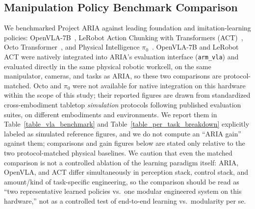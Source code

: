 \documentclass[journal]{IEEEtran}
\begin{document}
\subsection{Manipulation Policy Benchmark Comparison}
We benchmarked Project ARIA against leading foundation and imitation-learning policies: OpenVLA-7B~\cite{kim2024openvla}, LeRobot Action Chunking with Transformers (ACT)~\cite{zhao2023learning}, Octo Transformer~\cite{aria_019_ghosh_2024_octo}, and Physical Intelligence $\pi_0$~\cite{pi0_2024}. OpenVLA-7B and LeRobot ACT were natively integrated into ARIA's evaluation interface (\texttt{arm\_vla}) and evaluated directly in the same physical robotic workcell, on the same manipulator, cameras, and tasks as ARIA, so these two comparisons are protocol-matched. Octo and $\pi_0$ were not available for native integration on this hardware within the scope of this study; their reported figures are drawn from standardized cross-embodiment tabletop \emph{simulation} protocols following published evaluation suites, on different embodiments and environments. We report them in Table~\ref{table_vla_benchmark} and Table~\ref{table_per_task_breakdown} explicitly labeled as simulated reference figures, and we do not compute an ``ARIA gain'' against them; comparisons and gain figures below are stated only relative to the two protocol-matched physical baselines. We caution that even the matched comparison is not a controlled ablation of the learning paradigm itself: ARIA, OpenVLA, and ACT differ simultaneously in perception stack, control stack, and amount/kind of task-specific engineering, so the comparison should be read as ``two representative learned policies vs.\ one modular engineered system on this hardware,'' not as a controlled test of end-to-end learning vs.\ modularity per se.
\end{document}
